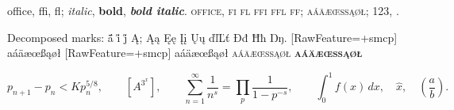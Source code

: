 \documentclass[11pt]{article}
\begin{document}
office, ffi, fl; \emph{italic}, \textbf{bold}, \textbf{\emph{bold italic}}.
\textsc{office, fi fl ffi ffl ff; aáäæœßąøł}; \texteuro{} 123, \texttrademark.

\ifdefined\directlua
  Decomposed marks: ā́̈ i̋ j̋ Ą; Ąą Ęę Įį Ųų ďľĽť Đđ Ħħ Ŋŋ.
  {[RawFeature=+smcp] aáäæœßąøł}
  {[RawFeature=+smcp] aáäæœßąøł}
\else
  {\footnotesize\scshape{}aáäæœßąøł}
  {\bfseries\scshape{}aáäæœßąøł}
\fi

\[ p_{n+1}-p_n<Kp_n^{5/8},\qquad [A^{3^x}],\qquad
   \sum_{n=1}^{\infty}\frac{1}{n^s}=\prod_p\frac{1}{1-p^{-s}},\qquad
   \int_0^1 f(x)\,dx,\quad \widehat{x},\quad \left(\frac{a}{b}\right). \]
\end{document}
